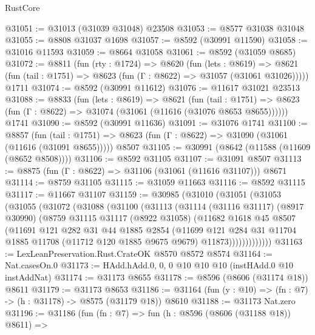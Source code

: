 \begin{lexlean}{RustCore}
\begin{coremodule}
@31051 := @31013 (@31039 @31048) @23508
@31053 := @8577 @31038 @31048
@31055 := @8808 @31037 @1698
@31057 := @8592 (@30991 @11590)
@31058 := @31016 @11593
@31059 := @8664 @31058
@31061 := @8592 (@31059 @8685)
@31072 := @8811
    (fun (rty : @1724) =>
    @8620
      (fun (lets : @8619) =>
      @8621 (fun (tail : @1751) => @8623 (fun (Γ : @8622) => @31057 (@31061 @31026)))))
    @1711
@31074 := @8592 (@30991 @11612)
@31076 := @11617 @31021 @23513
@31088 := @8833
    (fun (lets : @8619) =>
    @8621
      (fun (tail : @1751) =>
      @8623 (fun (Γ : @8622) => @31074 (@31061 (@11616 (@31076 @8653 @8655))))))
    @1741
@31090 := @8592 (@30991 @11636)
@31091 := @31076 @1741
@31100 := @8857
    (fun (tail : @1751) => @8623 (fun (Γ : @8622) => @31090 (@31061 (@11616 (@31091 @8655)))))
    @8507
@31105 := @30991 (@8642 (@11588 (@11609 (@8652 @8508))))
@31106 := @8592 @31105
@31107 := @31091 @8507
@31113 := @8875 (fun (Γ : @8622) => @31106 (@31061 (@11616 @31107))) @8671
@31114 := @8759 @31105
@31115 := @31059 @11663
@31116 := @8592 @31115
@31117 := @11667 @31107
@31159 := @30985
    (@31010
      (@31051
        (@31053
          (@31055
            (@31072
              (@31088
                (@31100
                  (@31113
                    (@31114
                      (@31116 @31117)
                      (@8917 @30990)
                      (@8759
                        @31115
                        @31117
                        (@8922 @31058)
                        (@11682
                          @1618
                          @45
                          @8507
                          (@11691
                            @121
                            @282
                            @31
                            @44
                            @1885
                            @2854
                            (@11699
                              @121
                              @284
                              @31
                              @11704
                              @1885
                              @11708
                              (@11712 @120 @1885 @9675 @9679)
                              @11873)))))))))))))
@31163 := LexLeanPreservation.Rust.CrateOK @8570 @8572 @8574
@31164 := Nat.casesOn.{0}
@31173 := HAdd.hAdd.{0, 0, 0} @10 @10 @10 (instHAdd.{0} @10 instAddNat)
@31174 := @31173 @8655
@31178 := @8596 (@8606 (@31174 @18)) @8611
@31179 := @31173 @8653
@31186 := @31164 (fun (y : @10) => (fn : @7) -> (h : @31178) -> @8575 (@31179 @18)) @8610
@31188 := @31173 Nat.zero
@31196 := @31186
    (fun (fn : @7) =>
    fun (h : @8596 (@8606 (@31188 @18)) @8611) =>

\end{coremodule}
\end{lexlean}

